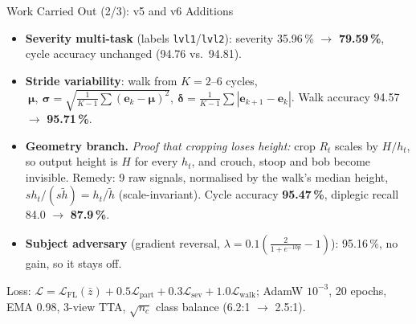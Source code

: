 \documentclass[aspectratio=169,10pt]{beamer}
\begin{document}
\begin{frame}{Work Carried Out (2/3): v5 and v6 Additions}
\small
\begin{itemize}
\item \textbf{Severity multi-task} (labels \texttt{lvl1}/\texttt{lvl2}):
severity 35.96\,\% $\rightarrow$ \textbf{79.59\,\%}, cycle accuracy unchanged
(94.76 vs.\ 94.81).
\item \textbf{Stride variability}: walk from $K=2$--6 cycles,
$\ \boldsymbol\mu,\ \boldsymbol\sigma=\sqrt{\tfrac{1}{K-1}\sum(\mathbf e_k-\boldsymbol\mu)^2},\
\boldsymbol\delta=\tfrac1{K-1}\sum|\mathbf e_{k+1}-\mathbf e_k|$.
Walk accuracy 94.57 $\rightarrow$ \textbf{95.71\,\%}.
\item \textbf{Geometry branch.} \emph{Proof that cropping loses height:} crop
$R_t$ scales by $H/h_t$, so output height is $H$ for every $h_t$, and crouch,
stoop and bob become invisible. Remedy: 9 raw signals, normalised by the
walk's median height, $s h_t/(s\tilde h)=h_t/\tilde h$ (scale-invariant).
Cycle accuracy \textbf{95.47\,\%}, diplegic recall 84.0 $\rightarrow$
\textbf{87.9\,\%}.
\item \textbf{Subject adversary} (gradient reversal,
$\lambda=0.1(\frac{2}{1+e^{-10p}}-1)$): 95.16\,\%, no gain, so it stays off.
\end{itemize}
\vspace{1mm}
\scriptsize Loss: $\mathcal L=\mathcal L_{\text{FL}}(\bar z)+0.5\mathcal
L_{\text{part}}+0.3\mathcal L_{\text{sev}}+1.0\mathcal L_{\text{walk}}$; AdamW
$10^{-3}$, 20 epochs, EMA 0.98, 3-view TTA, $\sqrt{n_c}$ class balance (6.2:1
$\rightarrow$ 2.5:1).
\end{frame}
\end{document}

